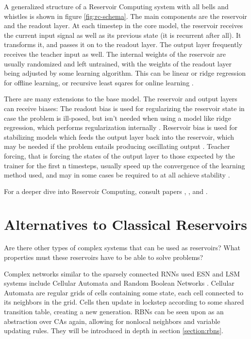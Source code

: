 A generalized structure of a Reservoir Computing system with all bells and whistles is shown in figure \ref{fig:rc-schema}.
The main components are the reservoir and the readout layer.
At each timestep in the core model,
the reservoir receives the current input signal as well as its previous state (it is recurrent after all).
It transforms it, and passes it on to the readout layer.
The output layer frequently receives the teacher input as well.
The internal weights of the reservoir are usually randomized and left untrained,
with the weights of the readout layer being adjusted by some learning algorithm.
This can be linear or ridge regression for offline learning,
or recursive least sqares for online learning \cite{Schrauwen2007}.

There are many extensions to the base model.
The reservoir and output layers can receive biases:
The readout bias is used for regularizing the reservoir state in case the problem is ill-posed,
but isn't needed when using a model like ridge regression, which performs regularization internally \cite{Schrauwen2007}.
Reservoir bias is used for stabilizing models which feeds the output layer back into the reservoir,
which may be needed if the problem entails producing oscillating output \cite{Jaeger:2007}.
Teacher forcing,
that is forcing the states of the output layer to those expected by the trainer for the first n timesteps,
usually speed up the convergence of the learning method used,
and may in some cases be required to at all achieve stability \cite{jaeger2002tutorial}.

For a deeper dive into Reservoir Computing,
consult papers \cite{Schrauwen2007}, \cite{lukovsevivcius2012reservoir}, and \cite{Jaeger:2007}.

\section{Alternatives to Classical Reservoirs}

Are there other types of complex systems that can be used as reservoirs?
What properties must these reservoirs have to be able to solve problems?

Complex networks similar to the sparsely connected RNNs used  ESN and LSM systems include Cellular Automata \cite{wolfram2002new} and Random Boolean Networks \cite{kauffman1969metabolic}.
Cellular Automata are regular grids of cells containing some state,
each cell connected to its neighbors in the grid.
Cells then update in lockstep according to some shared transition table,
creating a new generation.
RBNs can be seen upon as an abstraction over CAs again,
allowing for nonlocal neighbors and variable updating rules.
They will be introduced in depth in section \ref{section:rbns}.

